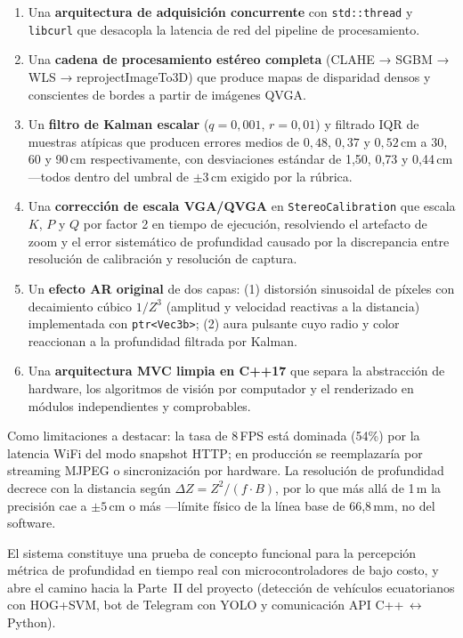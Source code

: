 \documentclass[12pt, a4paper]{article}
\begin{document}
\begin{enumerate}
  \item Una \textbf{arquitectura de adquisición concurrente} con \texttt{std::thread}
        y \texttt{libcurl} que desacopla la latencia de red del pipeline de
        procesamiento.
  \item Una \textbf{cadena de procesamiento estéreo completa}
        (CLAHE → SGBM → WLS → reprojectImageTo3D) que produce mapas de disparidad
        densos y conscientes de bordes a partir de imágenes QVGA.
  \item Un \textbf{filtro de Kalman escalar} ($q=0{,}001$, $r=0{,}01$) y
        filtrado IQR de muestras atípicas que producen errores medios de
        $0{,}48$, $0{,}37$ y $0{,}52$\,cm a 30, 60 y 90\,cm respectivamente,
        con desviaciones estándar de 1,50, 0,73 y 0,44\,cm —todos dentro del
        umbral de $\pm3$\,cm exigido por la rúbrica.
  \item Una \textbf{corrección de escala VGA/QVGA} en \texttt{StereoCalibration}
        que escala $K$, $P$ y $Q$ por factor 2 en tiempo de ejecución, resolviendo
        el artefacto de zoom y el error sistemático de profundidad causado por la
        discrepancia entre resolución de calibración y resolución de captura.
  \item Un \textbf{efecto AR original} de dos capas: (1) distorsión sinusoidal de
        píxeles con decaimiento cúbico $1/Z^3$ (amplitud y velocidad reactivas a la
        distancia) implementada con \texttt{ptr<Vec3b>}; (2) aura pulsante cuyo
        radio y color reaccionan a la profundidad filtrada por Kalman.
  \item Una \textbf{arquitectura MVC limpia en C++17} que separa la abstracción de
        hardware, los algoritmos de visión por computador y el renderizado en módulos
        independientes y comprobables.
\end{enumerate}

Como limitaciones a destacar: la tasa de 8\,FPS está dominada (54\%) por la latencia
WiFi del modo snapshot HTTP; en producción se reemplazaría por streaming MJPEG o
sincronización por hardware. La resolución de profundidad decrece con la distancia
según $\Delta Z = Z^2/(f\cdot B)$, por lo que más allá de 1\,m la precisión cae a
$\pm5$\,cm o más —límite físico de la línea base de 66,8\,mm, no del software.

El sistema constituye una prueba de concepto funcional para la percepción métrica de
profundidad en tiempo real con microcontroladores de bajo costo, y abre el camino
hacia la Parte~II del proyecto (detección de vehículos ecuatorianos con HOG+SVM,
bot de Telegram con YOLO y comunicación API C++\,$\leftrightarrow$\,Python).
\end{document}
